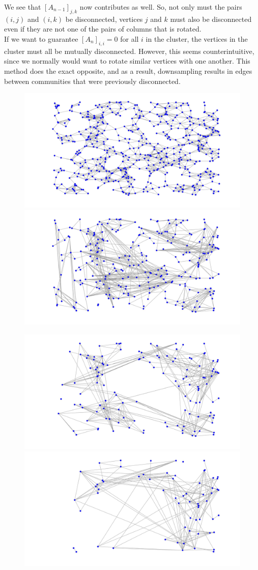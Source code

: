 \documentclass[a4paper]{article}
\begin{document}
We see that $[A_{n-1}]_{j,k}$ now contributes as well. So, not only must the pairs $(i,j)$ and $(i,k)$ be disconnected, vertices $j$ and $k$ must also be disconnected even if they are not one of the pairs of columns that is rotated.\\
If we want to guarantee $[A_n]_{i,i} = 0$ for all $i$ in the cluster, the vertices in the cluster must all be mutually disconnected. However, this seems counterintuitive, since we normally would want to rotate similar vertices with one another. This method does the exact opposite, and as a result, downsampling results in edges between communities that were previously disconnected.

\begin{figure}[H]
\centering
\includegraphics[width = 7 cm]{disconnected_pMMF/discon_1}
\includegraphics[width = 7 cm]{disconnected_pMMF/discon_2}

\includegraphics[width = 7 cm]{disconnected_pMMF/discon_3}
\includegraphics[width = 7 cm]{disconnected_pMMF/discon_4}


\end{figure}
\end{document}
